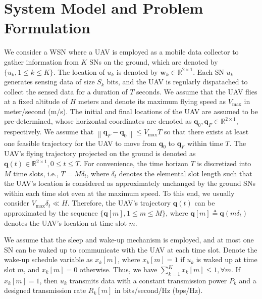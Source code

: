 \documentclass[journal]{IEEEtran}
\newcommand{\norm}[1]{\left\lVert#1\right\rVert}
\begin{document}
\section{System Model and Problem Formulation}\label{model}
We consider a WSN where a UAV is employed as a mobile data collector to gather information from $K$ SNs on the ground, which are denoted by $\{u_k, 1\leq k\leq K\}$. The location of $u_k$ is
denoted by $\mathbf{w}_k\in \mathbb{R}^{2\times 1}$. Each SN $u_k$ generates sensing data of size $S_k$ bits, and the UAV is regularly dispatached to collect the sensed data for a duration of $T$ seconds. We assume that the UAV flies at a fixed altitude of $H$ meters and denote its maximum flying speed as $V_{\max}$ in meter/second (m/s). The initial and
final locations of the UAV are assumed to be pre-determined, whose horizontal coordinates are denoted as $\mathbf{q}_0, \mathbf{q}_F \in \mathbb{R}^{2\times 1}$, respectively. We assume that $\norm{\mathbf{q}_F-\mathbf{q}_0}\leq V_{\max}T$ so that there exists at least one feasible trajectory for the UAV to move from $\mathbf{q}_0$ to $\mathbf{q}_F$ within time $T$. The UAV's flying trajectory projected on the ground is denoted as $\mathbf{q}(t)\in \mathbb{R}^{2\times 1}, 0 \leq t \leq T$. For convenience, the time horizon $T$ is discretized into $M$ time slots, i.e., $T = M\delta_t$, where $\delta_t$ denotes the elemental slot length such that the UAV's location is considered
as approximately unchanged by the ground SNs within each time slot even at the maximum speed. To this end, we usually consider $V_{\max}\delta_t\ll H$. Therefore, the UAV's trajectory $\mathbf{q}(t)$ can be approximated by the sequence $\{\mathbf{q}[m], 1\leq m\leq M\}$, where $\mathbf{q}[m]\triangleq \mathbf{q}(m\delta_t)$ denotes the UAV's location at time slot $m$.

We assume that the sleep and wake-up mechanism is employed, and at most one SN can be waked up to communicate with the UAV at each time slot. Denote the wake-up schedule variable as $x_{k}[m]$, where $x_k[m]=1$ if $u_k$ is waked up at time slot $m$, and $x_{k}[m]=0$ otherwise. Thus, we have $\sum_{k=1}^{K}x_{k}[m]\leq 1, \forall m$. If $x_{k}[m]=1$, then $u_k$ transmits data with a constant transmission power $P_k$ and a designed transmission rate $R_{k}[m]$ in bits/second/Hz (bps/Hz).
\end{document}
